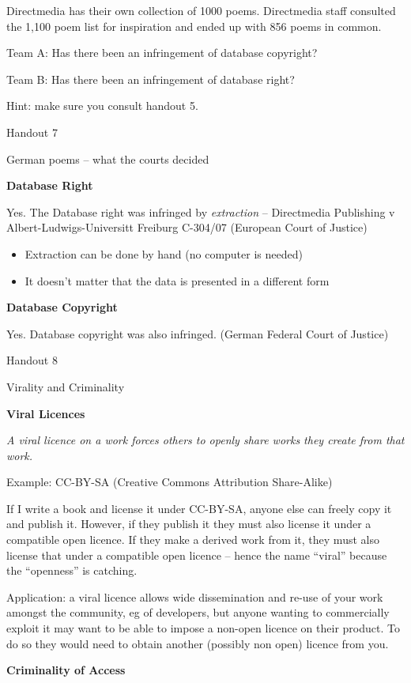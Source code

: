 Directmedia has their own collection of 1000 poems. Directmedia staff
consulted the 1,100 poem list for inspiration and ended up with 856
poems in common.

Team A: Has there been an infringement of database copyright?

Team B: Has there been an infringement of database right?

Hint: make sure you consult handout 5.

Handout 7

German poems -- what the courts decided

\textbf{Database Right}

Yes. The Database right was infringed by \emph{extraction} --
Directmedia Publishing v Albert-Ludwigs-Universitt Freiburg C-304/07
(European Court of Justice)

\begin{itemize}
\item
  Extraction can be done by hand (no computer is needed)
\item
  It doesn't matter that the data is presented in a different form
\end{itemize}

\textbf{Database Copyright}

Yes. Database copyright was also infringed. (German Federal Court of
Justice)

Handout 8

Virality and Criminality

\textbf{Viral Licences}

\emph{A viral licence on a work forces others to openly share works they
create from that work.}

Example: CC-BY-SA (Creative Commons Attribution Share-Alike)

If I write a book and license it under CC-BY-SA, anyone else can freely
copy it and publish it. However, if they publish it they must also
license it under a compatible open licence. If they make a derived work
from it, they must also license that under a compatible open licence --
hence the name ``viral'' because the ``openness'' is catching.

Application: a viral licence allows wide dissemination and re-use of
your work amongst the community, eg of developers, but anyone wanting to
commercially exploit it may want to be able to impose a non-open licence
on their product. To do so they would need to obtain another (possibly
non open) licence from you.

\textbf{Criminality of Access}

